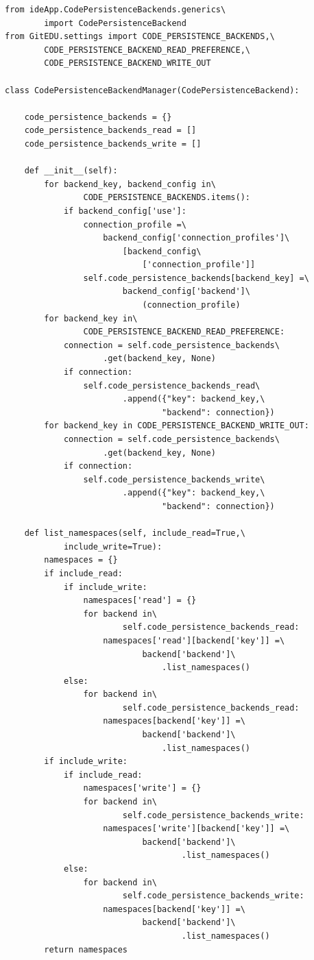 \begin{lstlisting}
from ideApp.CodePersistenceBackends.generics\
        import CodePersistenceBackend
from GitEDU.settings import CODE_PERSISTENCE_BACKENDS,\
        CODE_PERSISTENCE_BACKEND_READ_PREFERENCE,\
        CODE_PERSISTENCE_BACKEND_WRITE_OUT

class CodePersistenceBackendManager(CodePersistenceBackend):

    code_persistence_backends = {}
    code_persistence_backends_read = []
    code_persistence_backends_write = []

    def __init__(self):
        for backend_key, backend_config in\
                CODE_PERSISTENCE_BACKENDS.items():
            if backend_config['use']:
                connection_profile =\
                    backend_config['connection_profiles']\
                        [backend_config\
                            ['connection_profile']]
                self.code_persistence_backends[backend_key] =\
                        backend_config['backend']\
                            (connection_profile)
        for backend_key in\
                CODE_PERSISTENCE_BACKEND_READ_PREFERENCE:
            connection = self.code_persistence_backends\
                    .get(backend_key, None)
            if connection:
                self.code_persistence_backends_read\
                        .append({"key": backend_key,\
                                "backend": connection})
        for backend_key in CODE_PERSISTENCE_BACKEND_WRITE_OUT:
            connection = self.code_persistence_backends\
                    .get(backend_key, None)
            if connection:
                self.code_persistence_backends_write\
                        .append({"key": backend_key,\
                                "backend": connection})

    def list_namespaces(self, include_read=True,\
            include_write=True):
        namespaces = {}
        if include_read:
            if include_write:
                namespaces['read'] = {}
                for backend in\
                        self.code_persistence_backends_read:
                    namespaces['read'][backend['key']] =\
                            backend['backend']\
                                .list_namespaces()
            else:
                for backend in\
                        self.code_persistence_backends_read:
                    namespaces[backend['key']] =\
                            backend['backend']\
                                .list_namespaces()
        if include_write:
            if include_read:
                namespaces['write'] = {}
                for backend in\
                        self.code_persistence_backends_write:
                    namespaces['write'][backend['key']] =\
                            backend['backend']\
                                    .list_namespaces()
            else:
                for backend in\
                        self.code_persistence_backends_write:
                    namespaces[backend['key']] =\
                            backend['backend']\
                                    .list_namespaces()
        return namespaces


\end{lstlisting}
